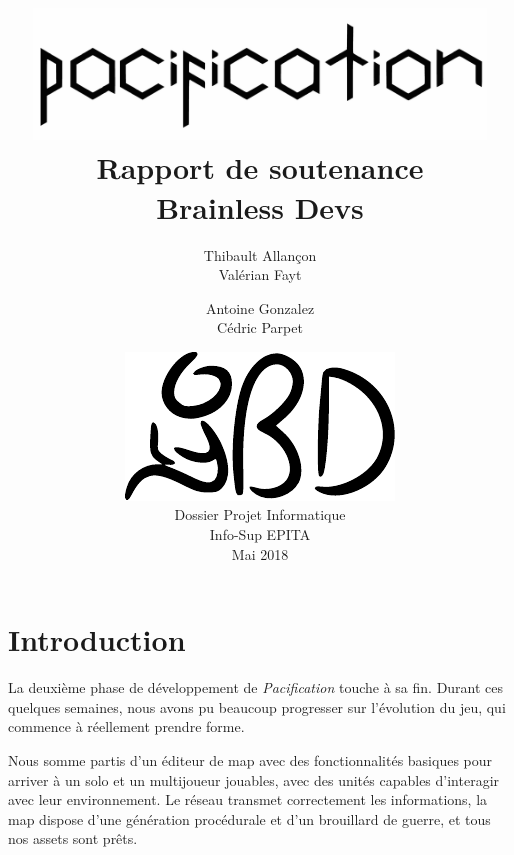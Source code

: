 \documentclass[12pt]{report}
\begin{document}
\title{
	{\vspace{3em}\protect\centering\protect\includegraphics[width=0.9\textwidth]{pacification_vector.pdf}}\\
	{\vspace{4em}\Huge Rapport de soutenance}\\
	{\large Brainless Devs}
}
\author{
	Thibault Allançon\\
	Valérian Fayt
	\and
	Antoine Gonzalez\\
	Cédric Parpet}
\date{
	{\vfill\protect\centering\protect\includegraphics{brainless_devs.pdf}}\\
	Dossier Projet Informatique\\
	Info-Sup EPITA\\
	Mai 2018
}

\maketitle
\tableofcontents

\chapter{Introduction}

La deuxième phase de développement de \textit{Pacification} touche à sa fin. Durant ces quelques semaines, nous avons pu beaucoup progresser sur l’évolution du jeu, qui commence à réellement prendre forme. 

Nous somme partis d’un éditeur de map avec des fonctionnalités basiques pour arriver à un solo et un multijoueur jouables, avec des unités capables d'interagir avec leur environnement. Le réseau transmet correctement les informations, la map dispose d’une génération procédurale et d’un brouillard de guerre, et tous nos assets sont prêts.
\end{document}
